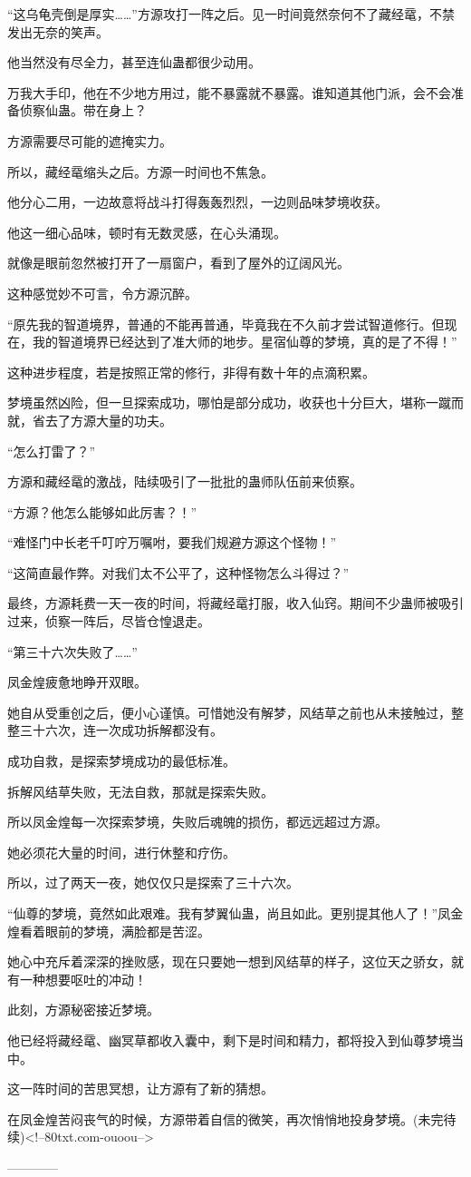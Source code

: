 \begin{this_body}
“这乌龟壳倒是厚实……”方源攻打一阵之后。见一时间竟然奈何不了藏经鼋，不禁发出无奈的笑声。

他当然没有尽全力，甚至连仙蛊都很少动用。

万我大手印，他在不少地方用过，能不暴露就不暴露。谁知道其他门派，会不会准备侦察仙蛊。带在身上？

方源需要尽可能的遮掩实力。

所以，藏经鼋缩头之后。方源一时间也不焦急。

他分心二用，一边故意将战斗打得轰轰烈烈，一边则品味梦境收获。

他这一细心品味，顿时有无数灵感，在心头涌现。

就像是眼前忽然被打开了一扇窗户，看到了屋外的辽阔风光。

这种感觉妙不可言，令方源沉醉。

“原先我的智道境界，普通的不能再普通，毕竟我在不久前才尝试智道修行。但现在，我的智道境界已经达到了准大师的地步。星宿仙尊的梦境，真的是了不得！”

这种进步程度，若是按照正常的修行，非得有数十年的点滴积累。

梦境虽然凶险，但一旦探索成功，哪怕是部分成功，收获也十分巨大，堪称一蹴而就，省去了方源大量的功夫。

“怎么打雷了？”

方源和藏经鼋的激战，陆续吸引了一批批的蛊师队伍前来侦察。

“方源？他怎么能够如此厉害？！”

“难怪门中长老千叮咛万嘱咐，要我们规避方源这个怪物！”

“这简直最作弊。对我们太不公平了，这种怪物怎么斗得过？”

最终，方源耗费一天一夜的时间，将藏经鼋打服，收入仙窍。期间不少蛊师被吸引过来，侦察一阵后，尽皆仓惶退走。

“第三十六次失败了……”

凤金煌疲惫地睁开双眼。

她自从受重创之后，便小心谨慎。可惜她没有解梦，风结草之前也从未接触过，整整三十六次，连一次成功拆解都没有。

成功自救，是探索梦境成功的最低标准。

拆解风结草失败，无法自救，那就是探索失败。

所以凤金煌每一次探索梦境，失败后魂魄的损伤，都远远超过方源。

她必须花大量的时间，进行休整和疗伤。

所以，过了两天一夜，她仅仅只是探索了三十六次。

“仙尊的梦境，竟然如此艰难。我有梦翼仙蛊，尚且如此。更别提其他人了！”凤金煌看着眼前的梦境，满脸都是苦涩。

她心中充斥着深深的挫败感，现在只要她一想到风结草的样子，这位天之骄女，就有一种想要呕吐的冲动！

此刻，方源秘密接近梦境。

他已经将藏经鼋、幽冥草都收入囊中，剩下是时间和精力，都将投入到仙尊梦境当中。

这一阵时间的苦思冥想，让方源有了新的猜想。

在凤金煌苦闷丧气的时候，方源带着自信的微笑，再次悄悄地投身梦境。(未完待续)<!--80txt.com-ouoou-->

------------

\end{this_body}

